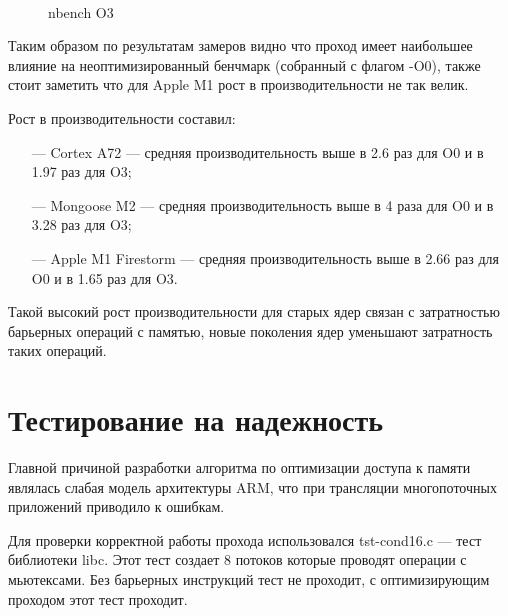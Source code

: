 \begin{figure}[hbtp]
	\centering
	\\
	\caption{nbench O3}
	\label{fig:speed}
\end{figure}

\newpage

Таким образом по результатам замеров видно что проход имеет наибольшее влияние на неоптимизированный бенчмарк (собранный с флагом -O0), также стоит заметить что для Apple M1 рост в производительности не так велик.

Рост в производительности составил:
\begin{itemize}[leftmargin=1.6\parindent]
	\item[---] Cortex A72 --- средняя производительность выше в 2.6 раз для O0 и в 1.97 раз для O3;
	\item[---] Mongoose M2 --- средняя производительность выше в 4 раза для O0 и в 3.28 раз для O3;
	\item[---] Apple M1 Firestorm --- средняя производительность выше в 2.66 раз для O0 и в 1.65 раз для O3.
\end{itemize}

Такой высокий рост производительности для старых ядер связан с затратностью барьерных операций с памятью, новые поколения ядер уменьшают затратность таких операций.

\section{Тестирование на надежность}

Главной причиной разработки алгоритма по оптимизации доступа к памяти являлась слабая модель архитектуры ARM, что при трансляции многопоточных приложений приводило к ошибкам.

Для проверки корректной работы прохода использовался tst-cond16.c --- тест библиотеки libc. Этот тест создает 8 потоков которые проводят операции с мьютексами. Без барьерных инструкций тест не проходит, с оптимизирующим проходом этот тест проходит.

